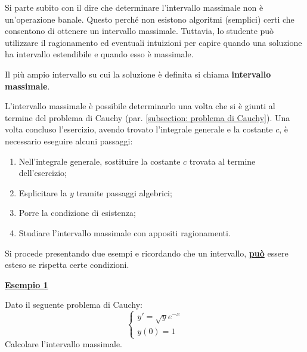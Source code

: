 \documentclass[a4paper]{article}
\newcommand{\definition}[1]{\textcolor{Red3}{\textbf{#1}}}
\newcommand{\example}[1]{\textcolor{Green4}{\textbf{#1}}}
\begin{document}
	Si parte subito con il dire che determinare l'intervallo massimale non è un'operazione banale. Questo perché non esistono algoritmi (semplici) certi che consentono di ottenere un intervallo massimale. Tuttavia, lo studente può utilizzare il ragionamento ed eventuali intuizioni per capire quando una soluzione ha intervallo estendibile e quando esso è massimale.

	\begin{boxdef}
		Il più ampio intervallo su cui la soluzione è definita si chiama \definition{intervallo massimale}.
	\end{boxdef}

	\noindent
	L'intervallo massimale è possibile determinarlo una volta che si è giunti al termine del problema di Cauchy (par. \ref{subsection: problema di Cauchy}). Una volta concluso l'esercizio, avendo trovato l'integrale generale e la costante $c$, è necessario eseguire alcuni passaggi:
	\begin{enumerate}[label=\alph*)]
		\item Nell'integrale generale, sostituire la costante $c$ trovata al termine dell'esercizio;
		\item Esplicitare la $y$ tramite passaggi algebrici;
		\item Porre la condizione di esistenza;
		\item Studiare l'intervallo massimale con appositi ragionamenti.
	\end{enumerate}
	Si procede presentando due esempi e ricordando che un intervallo, \underline{\textbf{può}} essere esteso se rispetta certe condizioni.

	\begin{flushleft}
		\example{\underline{Esempio 1}}
	\end{flushleft}

	\noindent
	Dato il seguente problema di Cauchy:
	\begin{equation*}
		\begin{cases}
			y' = \sqrt{y}e^{-x} \\
			y\left(0\right) = 1
		\end{cases}
	\end{equation*}
	Calcolare l'intervallo massimale.\newline
\end{document}
